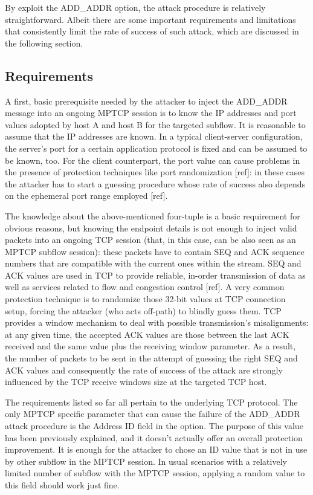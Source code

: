 \vspace{5mm} %
By exploit the ADD\_ADDR option, the attack procedure is relatively straightforward. Albeit there are some important requirements and limitations that consistently limit the rate of success of such attack, which are discussed in the following section.

\subsection{Requirements}
A first, basic prerequisite needed by the attacker to inject the ADD\_ADDR message into an ongoing MPTCP session is to know the IP addresses and port values adopted by host A and host B for the targeted subflow. It is reasonable to assume that the IP addresses are known. In a typical client-server configuration, the server's port for a certain application protocol is fixed and can be assumed to be known, too. For the client counterpart, the port value can cause problems in the presence of protection techniques like port randomization [ref]: in these cases the attacker has to start a guessing procedure whose rate of success also depends on the ephemeral port range employed [ref].

The knowledge about the above-mentioned four-tuple is a basic requirement for obvious reasons, but knowing the endpoint details is not enough to inject valid packets into an ongoing TCP session (that, in this case, can be also seen as an MPTCP subflow session): these packets have to contain SEQ and ACK sequence numbers that are compatible with the current ones within the stream. SEQ and ACK values are used in TCP to provide reliable, in-order transmission of data as well as services related to flow and congestion control [ref]. A very common protection technique is to randomize those 32-bit values at TCP connection setup, forcing the attacker (who acts off-path) to blindly guess them. TCP provides a window mechanism to deal with possible transmission's misalignments: at any given time, the accepted ACK values are those between the last ACK received and the same value plus the receiving window parameter. As a result, the number of packets to be sent in the attempt of guessing the right SEQ and ACK values and consequently the rate of success of the attack are strongly influenced by the TCP receive windows size at the targeted TCP host.

The requirements listed so far all pertain to the underlying TCP protocol. The only MPTCP specific parameter that can cause the failure of the ADD\_ADDR attack procedure is the Address ID field in the option. The purpose of this value has been previously explained, and it doesn't actually offer an overall protection improvement. It is enough for the attacker to chose an ID value that is not in use by other subflow in the MPTCP session. In usual scenarios with a relatively limited number of subflow with the MPTCP session, applying a random value to this field should work just fine.

